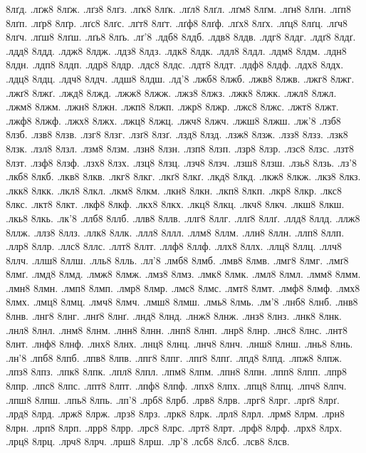 {8лґд.
.лґж8
8лґж.
.лґз8
8лґз.
.лґк8
8лґк.
.лґл8
8лґл.
.лґм8
8лґм.
.лґн8
8лґн.
.лґп8
8лґп.
.лґр8
8лґр.
.лґс8
8лґс.
.лґт8
8лґт.
.лґф8
8лґф.
.лґх8
8лґх.
.лґц8
8лґц.
.лґч8
8лґч.
.лґш8
8лґш.
.лґь8
8лґь.
.лґ'8
.лдб8
8лдб.
.лдв8
8лдв.
.лдг8
8лдг.
.лдґ8
8лдґ.
.лдд8
8лдд.
.лдж8
8лдж.
.лдз8
8лдз.
.лдк8
8лдк.
.лдл8
8лдл.
.лдм8
8лдм.
.лдн8
8лдн.
.лдп8
8лдп.
.лдр8
8лдр.
.лдс8
8лдс.
.лдт8
8лдт.
.лдф8
8лдф.
.лдх8
8лдх.
.лдц8
8лдц.
.лдч8
8лдч.
.лдш8
8лдш.
.лд'8
.лжб8
8лжб.
.лжв8
8лжв.
.лжг8
8лжг.
.лжґ8
8лжґ.
.лжд8
8лжд.
.лжж8
8лжж.
.лжз8
8лжз.
.лжк8
8лжк.
.лжл8
8лжл.
.лжм8
8лжм.
.лжн8
8лжн.
.лжп8
8лжп.
.лжр8
8лжр.
.лжс8
8лжс.
.лжт8
8лжт.
.лжф8
8лжф.
.лжх8
8лжх.
.лжц8
8лжц.
.лжч8
8лжч.
.лжш8
8лжш.
.лж'8
.лзб8
8лзб.
.лзв8
8лзв.
.лзг8
8лзг.
.лзґ8
8лзґ.
.лзд8
8лзд.
.лзж8
8лзж.
.лзз8
8лзз.
.лзк8
8лзк.
.лзл8
8лзл.
.лзм8
8лзм.
.лзн8
8лзн.
.лзп8
8лзп.
.лзр8
8лзр.
.лзс8
8лзс.
.лзт8
8лзт.
.лзф8
8лзф.
.лзх8
8лзх.
.лзц8
8лзц.
.лзч8
8лзч.
.лзш8
8лзш.
.лзь8
8лзь.
.лз'8
.лкб8
8лкб.
.лкв8
8лкв.
.лкг8
8лкг.
.лкґ8
8лкґ.
.лкд8
8лкд.
.лкж8
8лкж.
.лкз8
8лкз.
.лкк8
8лкк.
.лкл8
8лкл.
.лкм8
8лкм.
.лкн8
8лкн.
.лкп8
8лкп.
.лкр8
8лкр.
.лкс8
8лкс.
.лкт8
8лкт.
.лкф8
8лкф.
.лкх8
8лкх.
.лкц8
8лкц.
.лкч8
8лкч.
.лкш8
8лкш.
.лкь8
8лкь.
.лк'8
.ллб8
8ллб.
.ллв8
8ллв.
.ллг8
8ллг.
.ллґ8
8ллґ.
.ллд8
8ллд.
.ллж8
8ллж.
.ллз8
8ллз.
.ллк8
8ллк.
.ллл8
8ллл.
.ллм8
8ллм.
.ллн8
8ллн.
.ллп8
8ллп.
.ллр8
8ллр.
.ллс8
8ллс.
.ллт8
8ллт.
.ллф8
8ллф.
.ллх8
8ллх.
.ллц8
8ллц.
.ллч8
8ллч.
.ллш8
8ллш.
.лль8
8лль.
.лл'8
.лмб8
8лмб.
.лмв8
8лмв.
.лмг8
8лмг.
.лмґ8
8лмґ.
.лмд8
8лмд.
.лмж8
8лмж.
.лмз8
8лмз.
.лмк8
8лмк.
.лмл8
8лмл.
.лмм8
8лмм.
.лмн8
8лмн.
.лмп8
8лмп.
.лмр8
8лмр.
.лмс8
8лмс.
.лмт8
8лмт.
.лмф8
8лмф.
.лмх8
8лмх.
.лмц8
8лмц.
.лмч8
8лмч.
.лмш8
8лмш.
.лмь8
8лмь.
.лм'8
.лнб8
8лнб.
.лнв8
8лнв.
.лнг8
8лнг.
.лнґ8
8лнґ.
.лнд8
8лнд.
.лнж8
8лнж.
.лнз8
8лнз.
.лнк8
8лнк.
.лнл8
8лнл.
.лнм8
8лнм.
.лнн8
8лнн.
.лнп8
8лнп.
.лнр8
8лнр.
.лнс8
8лнс.
.лнт8
8лнт.
.лнф8
8лнф.
.лнх8
8лнх.
.лнц8
8лнц.
.лнч8
8лнч.
.лнш8
8лнш.
.лнь8
8лнь.
.лн'8
.лпб8
8лпб.
.лпв8
8лпв.
.лпг8
8лпг.
.лпґ8
8лпґ.
.лпд8
8лпд.
.лпж8
8лпж.
.лпз8
8лпз.
.лпк8
8лпк.
.лпл8
8лпл.
.лпм8
8лпм.
.лпн8
8лпн.
.лпп8
8лпп.
.лпр8
8лпр.
.лпс8
8лпс.
.лпт8
8лпт.
.лпф8
8лпф.
.лпх8
8лпх.
.лпц8
8лпц.
.лпч8
8лпч.
.лпш8
8лпш.
.лпь8
8лпь.
.лп'8
.лрб8
8лрб.
.лрв8
8лрв.
.лрг8
8лрг.
.лрґ8
8лрґ.
.лрд8
8лрд.
.лрж8
8лрж.
.лрз8
8лрз.
.лрк8
8лрк.
.лрл8
8лрл.
.лрм8
8лрм.
.лрн8
8лрн.
.лрп8
8лрп.
.лрр8
8лрр.
.лрс8
8лрс.
.лрт8
8лрт.
.лрф8
8лрф.
.лрх8
8лрх.
.лрц8
8лрц.
.лрч8
8лрч.
.лрш8
8лрш.
.лр'8
.лсб8
8лсб.
.лсв8
8лсв.
}
